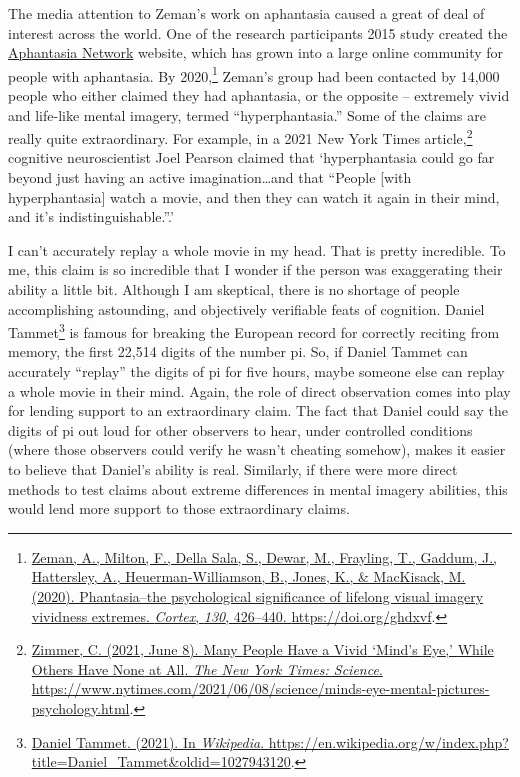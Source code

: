 \documentclass[
  oneside,
  12pt]{crumpbook}
\begin{document}
The media attention to Zeman's work on aphantasia caused a great of deal of interest across the world. One of the research participants 2015 study created the \href{https://aphantasia.com}{Aphantasia Network} website, which has grown into a large online community for people with aphantasia. By 2020,\footnote{\protect\hyperlink{ref-zemanPhantasiaPsychologicalSignificance2020}{Zeman, A., Milton, F., Della Sala, S., Dewar, M., Frayling, T., Gaddum, J., Hattersley, A., Heuerman-Williamson, B., Jones, K., \& MacKisack, M. (2020). Phantasia--the psychological significance of lifelong visual imagery vividness extremes. \emph{Cortex}, \emph{130}, 426--440. \url{https://doi.org/ghdxvf}}.} Zeman's group had been contacted by 14,000 people who either claimed they had aphantasia, or the opposite -- extremely vivid and life-like mental imagery, termed ``hyperphantasia.'' Some of the claims are really quite extraordinary. For example, in a 2021 New York Times article,\footnote{\protect\hyperlink{ref-zimmerManyPeopleHave2021}{Zimmer, C. (2021, June 8). Many {People Have} a {Vivid} {`{Mind}'s {Eye},'} {While Others Have None} at {All}. \emph{The New York Times: Science}. \url{https://www.nytimes.com/2021/06/08/science/minds-eye-mental-pictures-psychology.html}}.} cognitive neuroscientist Joel Pearson claimed that `hyperphantasia could go far beyond just having an active imagination\ldots and that ``People {[}with hyperphantasia{]} watch a movie, and then they can watch it again in their mind, and it's indistinguishable.''.'

I can't accurately replay a whole movie in my head. That is pretty incredible. To me, this claim is so incredible that I wonder if the person was exaggerating their ability a little bit. Although I am skeptical, there is no shortage of people accomplishing astounding, and objectively verifiable feats of cognition. Daniel Tammet\footnote{\protect\hyperlink{ref-DanielTammet2021}{Daniel {Tammet}. (2021). In \emph{Wikipedia}. \url{https://en.wikipedia.org/w/index.php?title=Daniel_Tammet\&oldid=1027943120}}.} is famous for breaking the European record for correctly reciting from memory, the first 22,514 digits of the number pi. So, if Daniel Tammet can accurately ``replay'' the digits of pi for five hours, maybe someone else can replay a whole movie in their mind. Again, the role of direct observation comes into play for lending support to an extraordinary claim. The fact that Daniel could say the digits of pi out loud for other observers to hear, under controlled conditions (where those observers could verify he wasn't cheating somehow), makes it easier to believe that Daniel's ability is real. Similarly, if there were more direct methods to test claims about extreme differences in mental imagery abilities, this would lend more support to those extraordinary claims.
\end{document}
